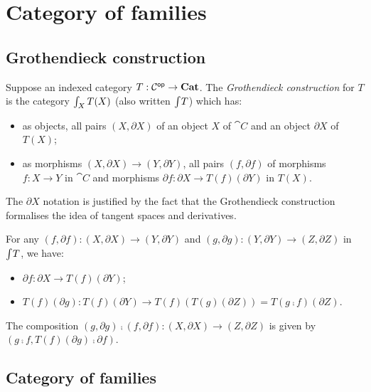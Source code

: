 \section{Category of families}
\label{sec:grothendieck}

\subsection{Grothendieck construction}

\begin{definition}
\label{def:grothendieck:Grothendieck}
Suppose an indexed category $T: \mathcal{C}^{\mathsf{op}} \to \mathbf{Cat}$. The \emph{Grothendieck construction} for $T$ is the
category $\int_{X}T(X)$ (also written $\int_{}T$) which has:
\begin{itemize}
\item as objects, all pairs $(X, \partial X)$ of an object $X$ of $\cat{C}$ and an object $\partial X$ of
$T(X)$;
\item as morphisms $(X, \partial X) \to (Y, \partial Y)$, all pairs $(f, \partial f)$ of morphisms $f: X \to
Y$ in $\cat{C}$ and morphisms $\partial f: \partial X \to T(f)(\partial Y)$ in $T(X)$.
\end{itemize}
\end{definition}

\noindent The $\partial X$ notation is justified by the fact that the Grothendieck construction formalises the
idea of tangent spaces and derivatives.

For any $(f, \partial f): (X, \partial X) \to (Y, \partial Y)$ and $(g, \partial g): (Y, \partial Y)
\to (Z, \partial Z)$ in $\int_{}T$, we have:

\begin{itemize}
\item $\partial f: \partial X \to T(f)(\partial Y)$;
\item $T(f)(\partial g): T(f)(\partial Y) \to T(f)(T(g)(\partial Z)) = T(g \comp f)(\partial Z)$.
\end{itemize}

\noindent The composition $(g, \partial g) \comp (f, \partial f): (X, \partial X) \to (Z, \partial Z)$ is
given by $(g \comp f, T(f)(\partial g) \comp \partial f)$.

\subsection{Category of families}

